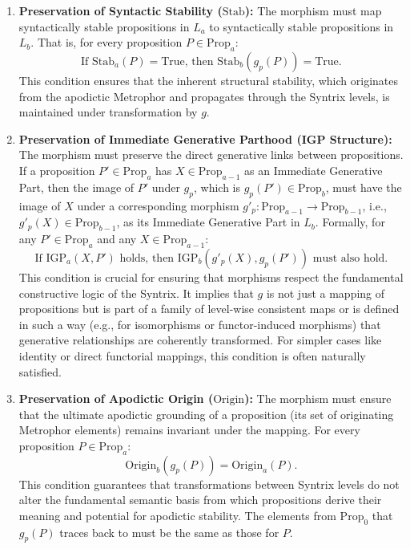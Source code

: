 \documentclass[
    12pt,              %
    a4paper,           %
    headings=normal,   %
    twoside=true,      %
    BCOR=8mm,          %
]{scrbook}
\begin{document}
\begin{enumerate}[label=(\alph*)]
    \item  \textbf{Preservation of Syntactic Stability (\(\text{Stab}\)):}
        The morphism must map syntactically stable propositions in \(L_a\) to syntactically stable propositions in \(L_b\). That is, for every proposition \(P \in \text{Prop}_a\):
        \[ \text{If } \text{Stab}_a(P) = \text{True, then } \text{Stab}_b(g_p(P)) = \text{True}. \]
        This condition ensures that the inherent structural stability, which originates from the apodictic Metrophor and propagates through the Syntrix levels, is maintained under transformation by \(g\).

    \item  \textbf{Preservation of Immediate Generative Parthood (IGP Structure):}
        The morphism must preserve the direct generative links between propositions. If a proposition \(P' \in \text{Prop}_a\) has \(X \in \text{Prop}_{a-1}\) as an Immediate Generative Part, then the image of \(P'\) under \(g_p\), which is \(g_p(P') \in \text{Prop}_b\), must have the image of \(X\) under a corresponding morphism \(g'_{p}: \text{Prop}_{a-1} \to \text{Prop}_{b-1}\), i.e., \(g'_{p}(X) \in \text{Prop}_{b-1}\), as its Immediate Generative Part in \(L_b\). Formally, for any \(P' \in \text{Prop}_a\) and any \(X \in \text{Prop}_{a-1}\):
        \[ \text{If } \text{IGP}_a(X, P') \text{ holds, then } \text{IGP}_b(g'_{p}(X), g_p(P')) \text{ must also hold.} \]
        This condition is crucial for ensuring that morphisms respect the fundamental constructive logic of the Syntrix. It implies that \(g\) is not just a mapping of propositions but is part of a family of level-wise consistent maps or is defined in such a way (e.g., for isomorphisms or functor-induced morphisms) that generative relationships are coherently transformed. For simpler cases like identity or direct functorial mappings, this condition is often naturally satisfied.

    \item  \textbf{Preservation of Apodictic Origin (\(\text{Origin}\)):}
        The morphism must ensure that the ultimate apodictic grounding of a proposition (its set of originating Metrophor elements) remains invariant under the mapping. For every proposition \(P \in \text{Prop}_a\):
        \[ \text{Origin}_b(g_p(P)) = \text{Origin}_a(P). \]
        This condition guarantees that transformations between Syntrix levels do not alter the fundamental semantic basis from which propositions derive their meaning and potential for apodictic stability. The elements from \(\text{Prop}_0\) that \(g_p(P)\) traces back to must be the same as those for \(P\).
\end{enumerate}
\end{document}
